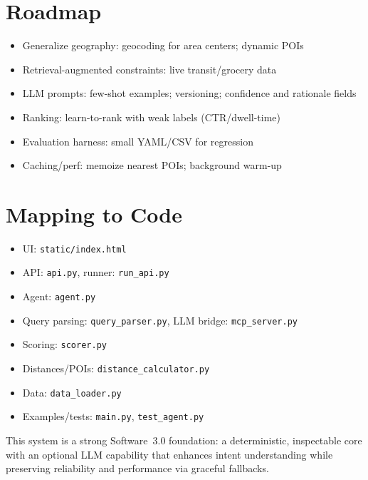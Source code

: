 \documentclass[11pt]{article}
\begin{document}
\section{Roadmap}
\begin{itemize}
  \item Generalize geography: geocoding for area centers; dynamic POIs
  \item Retrieval-augmented constraints: live transit/grocery data
  \item LLM prompts: few-shot examples; versioning; confidence and rationale fields
  \item Ranking: learn-to-rank with weak labels (CTR/dwell-time)
  \item Evaluation harness: small YAML/CSV for regression
  \item Caching/perf: memoize nearest POIs; background warm-up
\end{itemize}

\section{Mapping to Code}
\begin{itemize}
  \item UI: \texttt{static/index.html}
  \item API: \texttt{api.py}, runner: \texttt{run\_api.py}
  \item Agent: \texttt{agent.py}
  \item Query parsing: \texttt{query\_parser.py}, LLM bridge: \texttt{mcp\_server.py}
  \item Scoring: \texttt{scorer.py}
  \item Distances/POIs: \texttt{distance\_calculator.py}
  \item Data: \texttt{data\_loader.py}
  \item Examples/tests: \texttt{main.py}, \texttt{test\_agent.py}
\end{itemize}

\bigskip
This system is a strong Software~3.0 foundation: a deterministic, inspectable core with an optional LLM capability that enhances intent understanding while preserving reliability and performance via graceful fallbacks.
\end{document}
